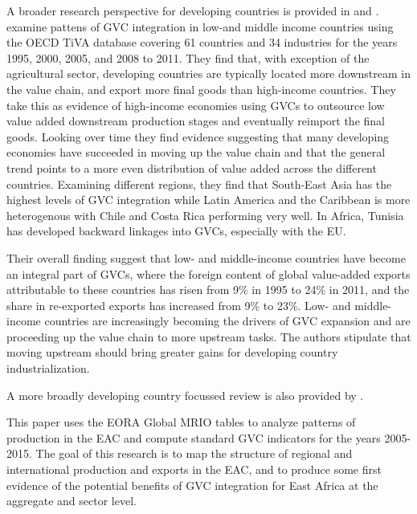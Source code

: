 \documentclass[a4paper]{article}
\begin{document}
A broader research perspective for developing countries is provided in \citet{Kummritz20162} and \citet{Kummritz20161}. \citet{Kummritz20162} examine pattens of GVC integration in low-and middle income countries using the OECD TiVA database covering 61 countries and 34 industries for the years 1995, 2000, 2005, and 2008 to 2011. They find that, with exception of the agricultural sector, developing countries are typically located more downstream in the value chain, and export more final goods than high-income countries. They take this as evidence of high-income economies using GVCs to outsource low value added downstream production stages and eventually reimport the final goods. Looking over time they find evidence suggesting that many developing economies have succeeded in moving up the value chain and that the general trend points to a more even distribution of value added across the different countries. Examining different regions, they find that South-East Asia has the highest levels of GVC integration while Latin America and the Caribbean is more heterogenous with Chile and Costa Rica performing very well. In Africa, Tunisia has developed backward linkages into GVCs, especially with the EU. \newline 

Their overall finding suggest that low- and middle-income countries have become an integral part of GVCs, where the foreign content of global value-added exports attributable to these countries has risen from 9\% in 1995 to 24\% in 2011, and the share in re-exported exports has increased from 9\% to 23\%. Low- and middle-income countries are increasingly becoming the drivers of GVC expansion and are proceeding up the value chain to more upstream tasks. The authors stipulate that moving upstream should bring greater gains for developing country industrialization. \newline

A more broadly developing country focussed review is also provided by \citet{kowalski2015participation}. \newline 

This paper uses the EORA Global MRIO tables \citet{lenzen2012mapping, lenzen2013building} to analyze patterns of production in the EAC and compute standard GVC indicators for the years 2005-2015. The goal of this research is to map the structure of regional and international production and exports in the EAC, and to produce some first evidence of the potential benefits of GVC integration for East Africa at the aggregate and sector level. \newline
\end{document}

